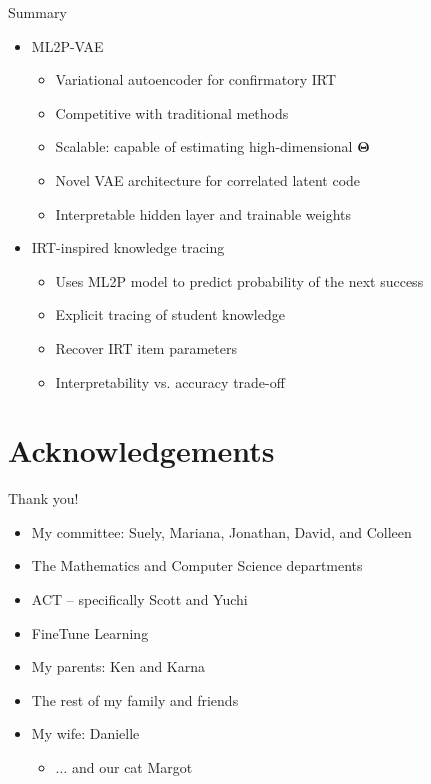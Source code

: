 \documentclass{beamer}
\newcommand{\vect}[1]{\boldsymbol{#1}}
\theoremstyle{definition}
\begin{document}
\begin{frame}{Summary}
  \begin{itemize}
    \item ML2P-VAE
      \begin{itemize}
        \item Variational autoencoder for confirmatory IRT
        \item<2-> Competitive with traditional methods
        \item<2-> Scalable: capable of estimating high-dimensional $\vect \Theta$
        \item<3-> Novel VAE architecture for correlated latent code
        \item<3-> Interpretable hidden layer and trainable weights
      \end{itemize}
      \bigskip
    \item IRT-inspired knowledge tracing
      \begin{itemize}
        \item Uses ML2P model to predict probability of the next success
        \item<4-> Explicit tracing of student knowledge
        \item<4-> Recover IRT item parameters
        \item<4-> Interpretability vs. accuracy trade-off
      \end{itemize}
  \end{itemize}
\end{frame}


\section*{Acknowledgements}
\begin{frame}{Thank you!}
  \begin{itemize}
    \item My committee: Suely, Mariana, Jonathan, David, and Colleen
    \item The Mathematics and Computer Science departments
    \item<2-> ACT -- specifically Scott and Yuchi
    \item<2-> FineTune Learning
    \item<3-> My parents: Ken and Karna
    \item<3-> The rest of my family and friends
    \item<3-> My wife: Danielle
      \begin{itemize}
        \item<4-> $\ldots$ and our cat Margot
      \end{itemize}
  \end{itemize}
\end{frame}
\end{document}
